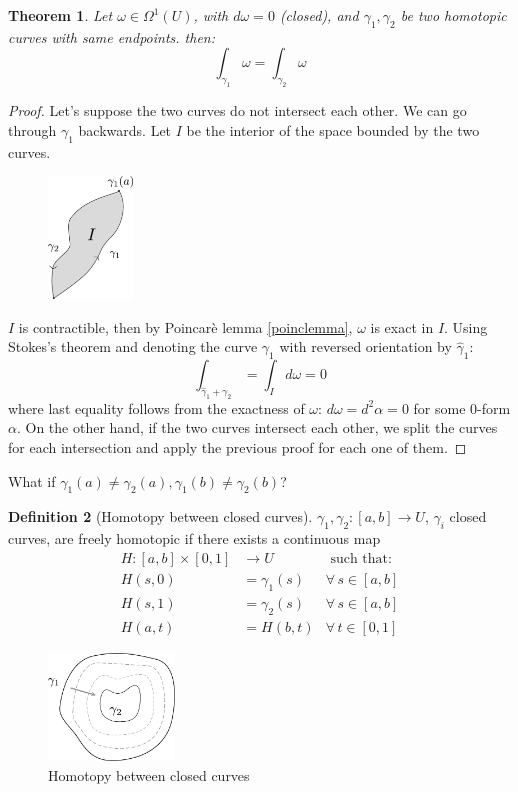 \documentclass[a4paper,11pt,titlepage, article, oneside]{memoir}
\numberwithin{equation}{section}
\newtheorem{theorem}{Theorem}[section]
\theoremstyle{definition}
\newtheorem{definition}[theorem]{Definition}
\theoremstyle{remark}
\begin{document}
\begin{theorem}
  Let $\omega \in \Omega^1(U)$, with $d \omega = 0$ (closed), and $\gamma_1, \gamma_2$ be two homotopic curves with same endpoints. then:
  \begin{equation}
    \int_{\gamma_1} \omega = \int_{\gamma_2} \omega
  \end{equation}
\end{theorem}
\begin{proof}
Let's suppose the two curves do not intersect each other.
We can go through $\gamma_1$ backwards. Let $I$ be the interior of the space bounded by the two curves.
\begin{figure}[h] \label{Fig:hom4}
     \centering
     \includegraphics[width=0.2\textwidth]{Images/homotopy4.pdf}    
\end{figure}
$I$ is contractible, then by Poincarè lemma \ref{poinclemma}, $\omega$ is exact in $I$. Using Stokes's theorem and denoting the curve $\gamma_1$ with reversed orientation by $\hat \gamma_1$:
$$\int_{\hat \gamma_1 + \gamma_2} = \int_I d \omega = 0$$
where last equality follows from the exactness of $\omega$: $d\omega = d^2 \alpha=0$ for some 0-form $\alpha$.
On the other hand, if the two curves intersect each other, we split the curves for each intersection and apply the previous proof for each one of them.
\end{proof}

What if $\gamma_1(a) \not = \gamma_2(a), \gamma_1(b) \not = \gamma_2(b)$?
\begin{definition}[Homotopy between closed curves]
$\gamma_1, \gamma_2 \colon [a, b] \rightarrow U$, $\gamma_i$ closed curves, are freely homotopic if there exists a continuous map
\begin{align*}
  H \colon [a, b] \times [0, 1] &\rightarrow U &\text{ such that:} \\
  H(s, 0) &= \gamma_1(s) &\forall\, s \in [a, b] \\
  H(s, 1) &= \gamma_2(s) &\forall\, s \in [a, b] \\
  H(a, t) &= H(b, t) &\forall\, t \in [0, 1]
\end{align*}
 \begin{figure}[h] \label{Fig:hom3}
     \centering
     \includegraphics[width=0.3\textwidth]{Images/homotopy3.pdf} 
     \caption{Homotopy between closed curves}      
\end{figure}
\end{definition}
\end{document}
